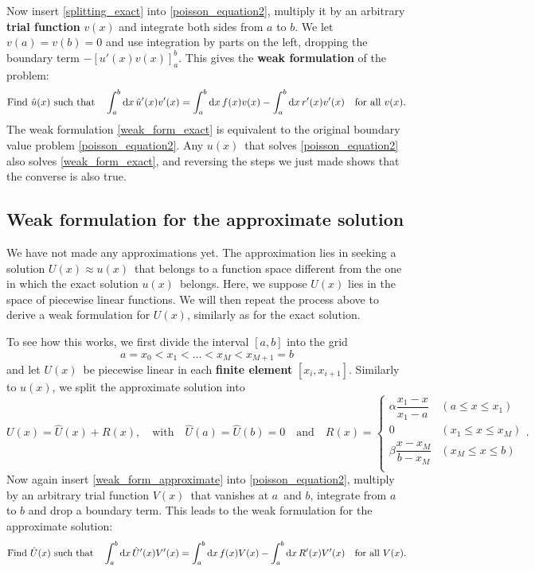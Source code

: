 Now insert \ref{splitting_exact} into \cref{poisson_equation2}, multiply it by an arbitrary \textbf{trial function} $v(x)$ and integrate both sides from $a$ to $b$.
We let $v(a) = v(b) = 0$ and use integration by parts on the left, dropping the boundary term $-[u'(x) v(x)]_a^b$.
This gives the \textbf{weak formulation} of the problem:
\newcommand{\weakform}[3]{
\text{Find} \,\, \hat{#1}(x) \,\, \text{such that}
\quad
\integral{\hat{#1}'(x) #2'(x)}{x}{a}{b} = \integral{f(x) #2(x)}{x}{a}{b} - \integral{#3'(x) #2'(x)}{x}{a}{b}
\quad
\text{for all} \,\, #2(x)
}
\begin{equation}
	\weakform{u}{v}{r}.
	\label{weak_form_exact}
\end{equation}
The weak formulation \ref{weak_form_exact} is equivalent to the original boundary value problem \ref{poisson_equation2}.
Any $u(x)$ that solves \ref{poisson_equation2} also solves \ref{weak_form_exact}, and reversing the steps we just made shows that the converse is also true.

\subsection{Weak formulation for the approximate solution}

We have not made any approximations yet.
The approximation lies in seeking a solution $U(x) \approx u(x)$ that belongs to a function space different from the one in which the exact solution $u(x)$ belongs.
Here, we suppose $U(x)$ lies in the space of piecewise linear functions.
We will then repeat the process above to derive a weak formulation for $U(x)$, similarly as for the exact solution.

To see how this works, we first divide the interval $[a, b]$ into the grid
\begin{equation}
	a = x_0 < x_1 < \dots < x_M < x_{M+1} = b
	\label{fem_grid}
\end{equation}
and let $U(x)$ be piecewise linear in each \textbf{finite element} $[x_i, x_{i+1}]$.
Similarly to $u(x)$, we split the approximate solution into
\begin{equation}
	U(x) = \hat{U}(x) + R(x), \quad \text{with} \quad \hat{U}(a) = \hat{U}(b) = 0 \quad \text{and} \quad R(x) = 
	\begin{cases}
		\alpha \dfrac{x_1-x}{x_1-a} & (a \leq x \leq x_1)   \\
		0                           & (x_1 \leq x \leq x_M) \\
		\beta  \dfrac{x-x_M}{b-x_M} & (x_M \leq x \leq b)   \\
	\end{cases}
	.
	\label{weak_form_approximate}
\end{equation}
Now again insert \ref{weak_form_approximate} into \ref{poisson_equation2}, multiply by an arbitrary trial function $V(x)$ that vanishes at $a$ and $b$, integrate from $a$ to $b$ and drop a boundary term.
This leads to the weak formulation for the approximate solution:
\begin{equation}
	\weakform{U}{V}{R}.
	\label{weak_form_approximate}
\end{equation}

